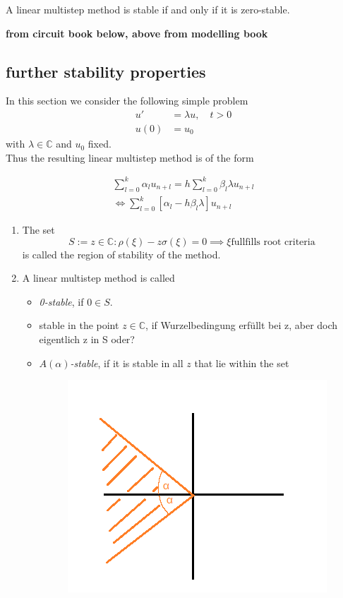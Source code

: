 	\begin{theorem}
		A linear multistep method is stable if and only if it is zero-stable.
	\end{theorem}
	
	\textbf{from circuit book below, above from modelling book}
	
	\subsection{further stability properties}
	In this section we consider the following simple problem
	\begin{align}
		u' &= \lambda u, \quad t > 0 \\
		u(0) &= u_0
	\end{align}
	with $\lambda \in \mathbb{C}$ and $u_0$ fixed.\\
	
	Thus the resulting linear multistep method is of the form
	
	\begin{align*}
		\sum_{l=0}^{k} \alpha_l u_{n+l} = h \sum_{l=0}^{k} \beta_l \lambda u_{n+l} \\
		\iff \sum_{l=0}^{k}  [\alpha_l - h \beta_l \lambda] u_{n+l}
	\end{align*}
	
	\begin{definition}
		\begin{enumerate}
			\item 
			The set
			\begin{equation}
				S := {z \in \mathbb{C} : \rho(\xi) - z \sigma(\xi) = 0 \implies \xi \text{fullfills root criteria}}
			\end{equation}
			is called the region of stability of the method.
			\item 
			A linear multistep method is called
			\begin{itemize}
				\item \emph{0-stable}, if $0 \in S$.
				\item stable in the point $z \in \mathbb{C}$, if Wurzelbedingung erfüllt bei z, aber doch eigentlich z in S oder?
				\item \emph{$A(\alpha)$-stable}, if it is stable in all $z$ that lie within the set
				 \begin{figure}[H]
				 	\centering
				 	\includegraphics[width=0.3\linewidth]{screenshot021}
				 	\caption{}
				 	\label{fig:screenshot021}
				 \end{figure}
				 
			\end{itemize}
		\end{enumerate}
	\end{definition}
	

